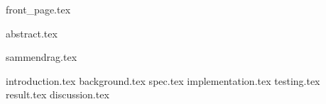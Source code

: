 \documentclass[dvipsnames, b5paper, twoside, openright]{report}
\begin{document}
{front_page.tex}

%

\setcounter{page}{1}
\setcounter{tocdepth}{3}

\let\cleardoublepage\clearpage
{abstract.tex}


\let\cleardoublepage\clearpage
{sammendrag.tex}


\let\cleardoublepage\clearpage
\tableofcontents
{}

\cleardoublepage



\setcounter{page}{1}
\fancyhead[R]{\itshape \nouppercase \rightmark}
\pagestyle{fancy}

\let\cleardoublepage\clearpage
{introduction.tex}
\let\cleardoublepage\clearpage
{background.tex}
\let\cleardoublepage\clearpage
{spec.tex}
\let\cleardoublepage\clearpage
{implementation.tex}
\let\cleardoublepage\clearpage
{testing.tex}
\let\cleardoublepage\clearpage
{result.tex}
\let\cleardoublepage\clearpage
{discussion.tex}


\let\cleardoublepage\clearpage
\begin{appendices}
\end{appendices}

\let\cleardoublepage\clearpage
\printbibliography
{}
\end{document}
